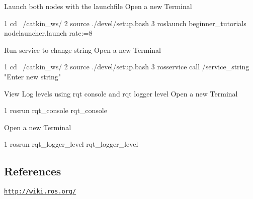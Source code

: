 \begin{DoxyEnumerate}
\item Launch both nodes with the launchfile Open a new Terminal 
\begin{DoxyCode}
1 cd ~/catkin\_ws/
2 source ./devel/setup.bash
3 roslaunch beginner\_tutorials nodelauncher.launch rate:=8
\end{DoxyCode}

\item Run service to change string Open a new Terminal 
\begin{DoxyCode}
1 cd ~/catkin\_ws/
2 source ./devel/setup.bash
3 rosservice call /service\_string "Enter new string"
\end{DoxyCode}

\item View Log levels using rqt console and rqt logger level Open a new Terminal 
\begin{DoxyCode}
1 rosrun rqt\_console rqt\_console
\end{DoxyCode}
 Open a new Terminal 
\begin{DoxyCode}
1 rosrun rqt\_logger\_level rqt\_logger\_level
\end{DoxyCode}

\end{DoxyEnumerate}

\subsection*{References}


\begin{DoxyItemize}
\item \href{http://wiki.ros.org/}{\tt http\+://wiki.\+ros.\+org/} 
\end{DoxyItemize}